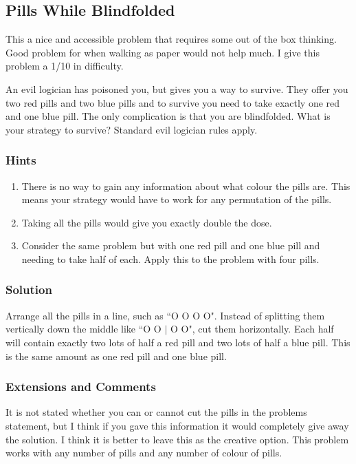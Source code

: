 \subsection{Pills While Blindfolded}

This a nice and accessible problem that requires some out of the box thinking. Good problem for when walking as paper would not help much. I give this problem a 1/10 in difficulty.

An evil logician has poisoned you, but gives you a way to survive. They offer you two red pills and two blue pills and to survive you need to take exactly one red and one blue pill. The only complication is that you are blindfolded. What is your strategy to survive? Standard evil logician rules apply.

\subsubsection{Hints}

\begin{enumerate}
	\item There is no way to gain any information about what colour the pills are. This means your strategy would have to work for any permutation of the pills.
	\item Taking all the pills would give you exactly double the dose.
	\item Consider the same problem but with one red pill and one blue pill and needing to take half of each. Apply this to the problem with four pills.
\end{enumerate}

\subsubsection{Solution}

Arrange all the pills in a line, such as ``O O O O". Instead of splitting them vertically down the middle like ``O O $|$ O O", cut them horizontally. Each half will contain exactly two lots of half a red pill and two lots of half a blue pill. This is the same amount as one red pill and one blue pill.

\subsubsection{Extensions and Comments}

It is not stated whether you can or cannot cut the pills in the problems statement, but I think if you gave this information it would completely give away the solution. I think it is better to leave this as the creative option. This problem works with any number of pills and any number of colour of pills.